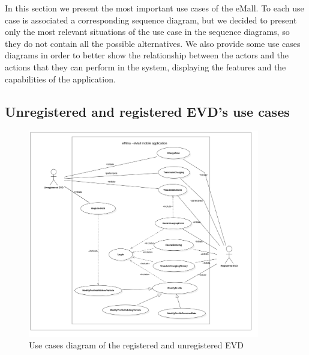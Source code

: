 In this section we present the most important use cases of the eMall. To each use case is associated a corresponding sequence diagram, but we decided to present only the most relevant situations of the use case in the sequence diagrams, so they do not contain all the possible alternatives. We also provide some use cases diagrams in order to better show the relationship between the actors and the actions that they can perform in the system, displaying the features and the capabilities of the application.

\subsection{Unregistered and registered EVD's use cases}
\begin{figure}[H]
    \centering
    \includegraphics[width=0.9\textwidth, trim = {3cm 2cm 3cm 1cm}, clip]{Images/cp3/UseCaseDiagramEVD.png}
    \caption{Use cases diagram of the registered and unregistered EVD}
\end{figure}

